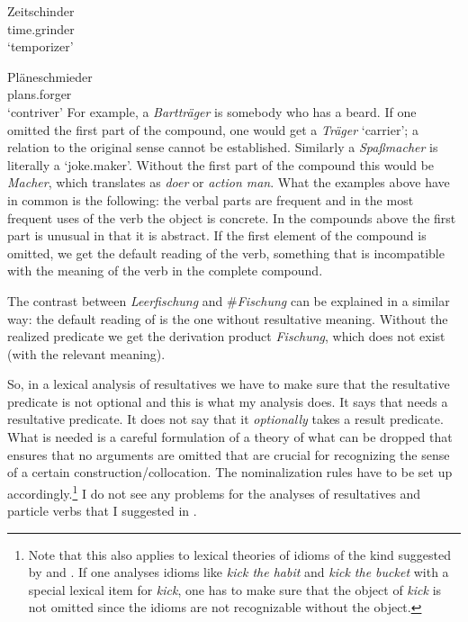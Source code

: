 \ex 
\gll Zeitschinder\\
     time.grinder\\
\glt `temporizer'

\ex 
\gll Pläneschmieder\\
     plans.forger\\
\glt `contriver' 
\zl
For example, a \emph{Bartträger} is somebody who has a beard. If one omitted the first part of the
compound, one would get a \emph{Träger} `carrier'; a relation to the original sense cannot be
established. Similarly a \emph{Spaßmacher} is literally a `joke.maker'. Without the first part of the
compound this would be \emph{Macher}, which translates as \emph{doer} or \emph{action man}. 
%
What the examples above have in common is the following: the verbal parts are frequent and in the
most frequent uses of the verb the object is concrete. In the compounds above the first part is
unusual in that it is abstract. If the first element of the compound is omitted, we get the default
reading of the verb, something that is incompatible with the meaning of the verb in the complete
compound.

The contrast between \emph{Leerfischung} and \#\emph{Fischung} can be explained in a similar way:
the default reading of  is the one without resultative meaning. Without the realized
predicate we get the derivation product \emph{Fischung}, which does not exist (with the relevant meaning).

So, in a lexical analysis of resultatives we have to make sure that the resultative predicate is not
optional and this is what my analysis does. It says that  needs a resultative
predicate. It does not say that it \emph{optionally} takes a result predicate. What is needed is a careful
formulation of a theory of what can be dropped that ensures that no arguments are omitted that
are crucial for recognizing the sense of a certain construction/collocation. The nominalization rules have to be set up
accordingly.\footnote{%
  Note that this also applies to lexical theories of idioms of the kind suggested by
  \citet{Sag2007a} and \citet*{KSF2015a}. If one analyses idioms like \emph{kick the habit} and
  \emph{kick the bucket} with a special lexical item for \emph{kick}, one has to make sure that the object of \emph{kick} is not
  omitted since the idioms are not recognizable without the object.
}
I do not see any problems for the analyses of resultatives and particle verbs that I
suggested in .



